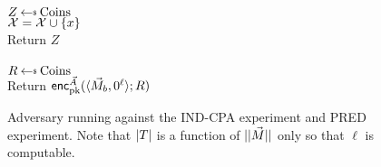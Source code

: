 \begin{figure}[tbhp]
\begin{center}
{\\
  $Z \getsr \mathrm{Coins}$\\
  $\mathcal{X} = \mathcal{X} \cup \{x\}$ \\
  Return $Z$\\

\\
$R \getsr \mathrm{Coins}$\\
Return ${\mathsf{enc}}_{\mathrm{pk}}^{\vec{A}}(\langle \vec{M}_b,0^{\ell}\rangle;R)$\\
}
\caption{Adversary running against the IND-CPA experiment and PRED experiment.
Note that $|T|$ is a function of $||\vec{M}||$ only so that $\ell$ is computable.}
\label{fig:CPA-adv}
\end{center}
\end{figure}


